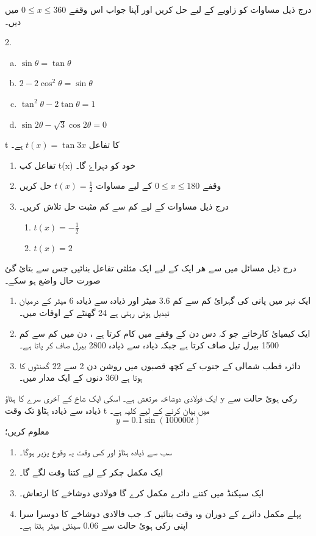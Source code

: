 درج ذیل مساوات کو زاویے کے لیے حل کریں اور آپنا جواب اس وقفے \(0\le x\le 360\)  میں دیں۔
\begin{multicols}{2.}
\begin{enumerate}[a.]
\item   \(\sin\theta=\tan\theta \)
\item    \(2-2\cos^2\theta=\sin\theta \)
\item     \(\tan^2\theta-2\tan\theta=1 \)
\item    \(\sin2\theta-\sqrt{3}\cos2\theta=0 \)
\end{enumerate}
\end{multicols}
t 
کا تفاعل \(t(x)=\tan3x \) ہے۔
\begin{enumerate}
\item
تفاعل  کب t(x)  خود  کو  دہراۓ گا۔ 
\item
 وقفے   \(0\leq x\leq180\)  کے لیے  مساوات  \(t(x)=\frac{1}{2} \) حل کریں 
\item
درج ذیل مساوات کے لیے کم سے کم مثبت حل تلاش کریں۔
\begin{enumerate}
\item  \(t(x)=-\frac{1}{2}\)
\item  \(t(x)=2\)
\end{enumerate}

\end{enumerate}

درج ذیل مسائل میں سے ھر ایک کے لیے ایک مثلثی تفاعل بنائیں جس سے بتائ گئ صورت حال واضع ہو سکے۔
\begin{enumerate}
\item
 ایک نہر میں پانی کی گہرائ کم سے کم 3.6 میٹر اور ذیادہ سے ذیادہ 6 میٹر کے درمیان تبدیل ہوتی رہتی ہے 24 گھنٹے کے اوقات میں۔
\item
ایک کیمیائ کارخانے جو کہ دس دن کے وقفے میں کام کرتا ہے ، دن میں کم سے کم 1500 بیرل تیل صاف کرتا ہے جبکہ ذیادہ سے ذیادہ 2800 بیرل صاف کر پاتا ہے۔
\item
دائرہ قطب شمالی کے جنوب کے کچھ قصبوں میں روشن دن 2 سے 22 گھنٹوں کا ہوتا ہے 360 دنوں کے ایک مدار میں۔
\end{enumerate}

ایک فولادی دوشاخہ مرتعش ہے۔ اسکی ایک شاخ کے آخری سرے کا ہٹاؤ  y رکی ہوئ حالت سے ذیادہ سے ذیادہ ہٹاؤ تک وقت t میں بیان کرنے کے لیے کلیہ ہے۔\[y=0.1 \sin(100000t) \]
معلوم کریں؛
\begin{enumerate}
\item
 سب سے ذیادہ ہٹاؤ اور کس وقت یہ وقوع پزیر ہوگا۔
\item    
 ایک مکمل چکر کے لیے کتنا وقت لگے گا۔
\item    
ایک سیکنڈ میں کتنے دائرے مکمل کرے گا فولادی دوشاخے کا  ارتعاش۔
\item  
 پہلے مکمل دائرے کے دوران وہ وقت بتائیں کہ جب فالادی دوشاخے کا دوسرا سرا اپنی رکی ہوئ حالت سے 0.06 سینٹی میٹر ہٹتا ہے۔ 
\end{enumerate}

